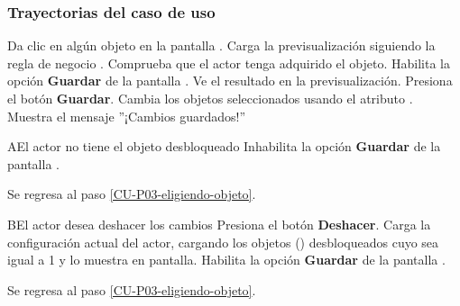 \subsubsection{Trayectorias del caso de uso}

\begin{UCtrayectoria}%
%
    \Actor Da clic en algún objeto en la pantalla .
    \label{CU-P03-eligiendo-objeto}
    \Sistema Carga la previsualización siguiendo la regla de negocio .
    \Sistema Comprueba que el actor tenga adquirido el objeto. 
    \Sistema Habilita la opción \textbf{Guardar} de la pantalla .
    \Actor Ve el resultado en la previsualización. 
    \Actor Presiona el botón \textbf{Guardar}.
    \Sistema Cambia los objetos seleccionados usando el atributo .
    \Sistema Muestra el mensaje ''¡Cambios guardados!''%
\end{UCtrayectoria}

\begin{UCtrayectoriaA}%
  {A}{El actor no tiene el objeto desbloqueado }
    \Sistema Inhabilita la opción \textbf{Guardar} de la pantalla .
    \item Se regresa al paso \ref{CU-P03-eligiendo-objeto}.

\end{UCtrayectoriaA}


\begin{UCtrayectoriaA}%
  {B}{El actor desea deshacer los cambios }
    \Actor  Presiona el botón \textbf{Deshacer}.
    \Sistema Carga la configuración actual del actor,
        cargando los objetos  () desbloqueados cuyo
         sea igual a 1  y lo muestra en pantalla.
    \Sistema Habilita la opción \textbf{Guardar} de la pantalla .
    \item Se regresa al paso \ref{CU-P03-eligiendo-objeto}.

\end{UCtrayectoriaA}
